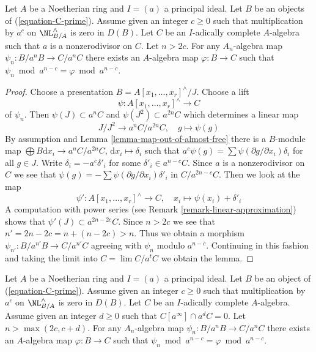 \begin{lemma}
\label{lemma-get-morphism-nonzerodivisor}
Let $A$ be a Noetherian ring and $I = (a)$ a principal ideal.
Let $B$ be an objects of (\ref{equation-C-prime}).
Assume given an integer $c \geq 0$ such that
multiplication by $a^c$ on $\NL^\wedge_{B/A}$ is zero in $D(B)$.
Let $C$ be an $I$-adically complete $A$-algebra such that
$a$ is a nonzerodivisor on $C$. Let $n > 2c$. For any $A_n$-algebra
map $\psi_n : B/a^nB \to C/a^nC$ there exists an $A$-algebra
map $\varphi : B \to C$ such that
$\psi_n \bmod a^{n - c} = \varphi \bmod a^{n - c}$.
\end{lemma}

\begin{proof}
Choose a presentation $B = A[x_1, \ldots, x_r]^\wedge/J$. Choose
a lift
$$
\psi : A[x_1, \ldots, x_r]^\wedge \to C
$$
of $\psi_n$. Then $\psi(J) \subset a^nC$ and $\psi(J^2) \subset a^{2n}C$
which determines a linear map
$$
J/J^2 \longrightarrow a^nC/a^{2n}C,\quad g \longmapsto \psi(g)
$$
By assumption and Lemma \ref{lemma-map-out-of-almost-free}
there is a $B$-module map
$\bigoplus B\text{d}x_i \to a^nC/a^{2n}C$,
$\text{d}x_i \mapsto \delta_i$ such that
$a^c \psi(g) = \sum \psi(\partial g/\partial x_i) \delta_i$
for all $g \in J$. Write $\delta_i = - a^c \delta'_i$ for some
$\delta'_i \in a^{n - c}C$. Since $a$ is a nonzerodivisor
on $C$ we see that $\psi(g) = - \sum \psi(\partial g/\partial x_i) \delta'_i$
in $C/a^{2n - c}C$.
Then we look at the map
$$
\psi' : A[x_1, \ldots, x_r]^\wedge \to C,\quad
x_i \longmapsto \psi(x_i) + \delta'_i
$$
A computation with power series (see Remark \ref{remark-linear-approximation})
shows that $\psi'(J) \subset a^{2n - 2c}C$. Since $n > 2c$
we see that $n' = 2n - 2c = n + (n - 2c) > n$. Thus we obtain a morphism
$\psi_{n'} : B/a^{n'}B \to C/a^{n'}C$ agreeing with $\psi_n$ modulo
$a^{n - c}$. Continuing in this fashion and taking the limit
into $C = \lim C/a^tC$ we obtain the lemma.
\end{proof}

\begin{lemma}
\label{lemma-get-morphism-principal}
Let $A$ be a Noetherian ring and $I = (a)$ a principal ideal.
Let $B$ be an object of (\ref{equation-C-prime}).
Assume given an integer $c \geq 0$ such that
multiplication by $a^c$ on $\NL^\wedge_{B/A}$ is zero in $D(B)$.
Let $C$ be an $I$-adically complete $A$-algebra.
Assume given an integer $d \geq 0$ such that $C[a^\infty] \cap a^dC = 0$.
Let $n > \max(2c, c + d)$. For any $A_n$-algebra map
$\psi_n : B/a^nB \to C/a^nC$ there exists an $A$-algebra map
$\varphi : B \to C$ such
that $\psi_n \bmod a^{n - c} = \varphi \bmod a^{n - c}$.
\end{lemma}


